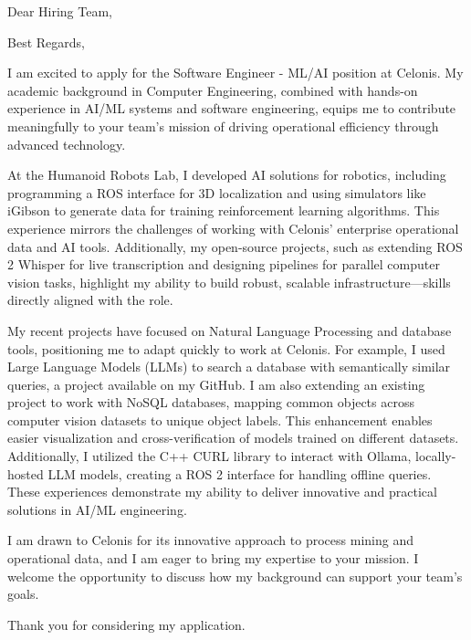 \documentclass[11pt,a4paper,skipsamekey]{moderncv}
\begin{document}
	\date{\today}
	\opening{Dear Hiring Team,}
	\closing{Best Regards,}
	\makelettertitle
	
I am excited to apply for the Software Engineer - ML/AI position at Celonis. My academic background in Computer Engineering, combined with hands-on experience in AI/ML systems and software engineering, equips me to contribute meaningfully to your team’s mission of driving operational efficiency through advanced technology.

At the Humanoid Robots Lab, I developed AI solutions for robotics, including programming a ROS interface for 3D localization and using simulators like iGibson to generate data for training reinforcement learning algorithms. This experience mirrors the challenges of working with Celonis' enterprise operational data and AI tools. Additionally, my open-source projects, such as extending ROS 2 Whisper for live transcription and designing pipelines for parallel computer vision tasks, highlight my ability to build robust, scalable infrastructure—skills directly aligned with the role.

My recent projects have focused on Natural Language Processing and database tools, positioning me to adapt quickly to work at Celonis. For example, I used Large Language Models (LLMs) to search a database with semantically similar queries, a project available on my GitHub. I am also extending an existing project to work with NoSQL databases, mapping common objects across computer vision datasets to unique object labels. This enhancement enables easier visualization and cross-verification of models trained on different datasets. Additionally, I utilized the C++ CURL library to interact with Ollama, locally-hosted LLM models, creating a ROS 2 interface for handling offline queries. These experiences demonstrate my ability to deliver innovative and practical solutions in AI/ML engineering.

I am drawn to Celonis for its innovative approach to process mining and operational data, and I am eager to bring my expertise to your mission. I welcome the opportunity to discuss how my background can support your team’s goals.

Thank you for considering my application.
\end{document}
